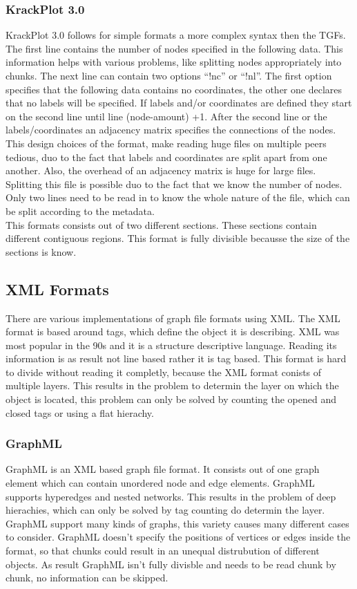 \subsubsection{KrackPlot 3.0}
KrackPlot 3.0 follows for simple formats a more complex syntax then the TGFs. The first line contains the number of nodes specified in the following data. This information helps with various problems, like splitting nodes appropriately into chunks. The next line can contain two options “!nc” or “!nl”. The first option specifies that the following data contains no coordinates, the other one declares that no labels will be specified. If labels and/or coordinates are defined they start on the second line until line (node-amount) +1. After the second line or the labels/coordinates an adjacency matrix specifies the connections of the nodes.
This design choices of the format, make reading huge files on multiple peers tedious, duo to the fact that labels and coordinates are split apart from one another. Also, the overhead of an adjacency matrix is huge for large files.
Splitting this file is possible duo to the fact that we know the number of nodes. Only two lines need to be read in to know the whole nature of the file, which can be split according to the metadata.\cite{D.KrackhardtJ.BlytheC.McGrath.4.12.2001}\\
This formats consists out of two different sections. These sections contain different contiguous regions. This format is fully divisible becausse the size of the sections is know. 

\subsection{XML Formats}
There are various implementations of graph file formats using XML. The XML format is based around tags, which define the object it is describing. XML was most popular in the 90s and it is a structure descriptive language. Reading its information is as result not line based rather it is tag based. This format is hard to divide without reading it completly, because the XML format conists of multiple layers. This results in the problem to determin the layer on which the object is located, this problem can only be solved by counting the opened and closed tags or using a flat hierachy.\cite{bray1997extensible,Roughan.10.03.2015}


\subsubsection{GraphML}
GraphML is an XML based graph file format. It consists out of one graph element which can contain unordered node and edge elements. GraphML supports hyperedges and nested networks. This results in the problem of deep hierachies, which can only be solved by tag counting do determin the layer. GraphML support many kinds of graphs, this variety causes many different cases to consider. GraphML doesn't specify the positions of vertices or edges inside the format, so that chunks could result in an unequal distrubution of different objects. As result GraphML isn't fully divisble and needs to be read chunk by chunk, no information can be skipped.\cite{brandes2013graph,kuhner2013graphml}

